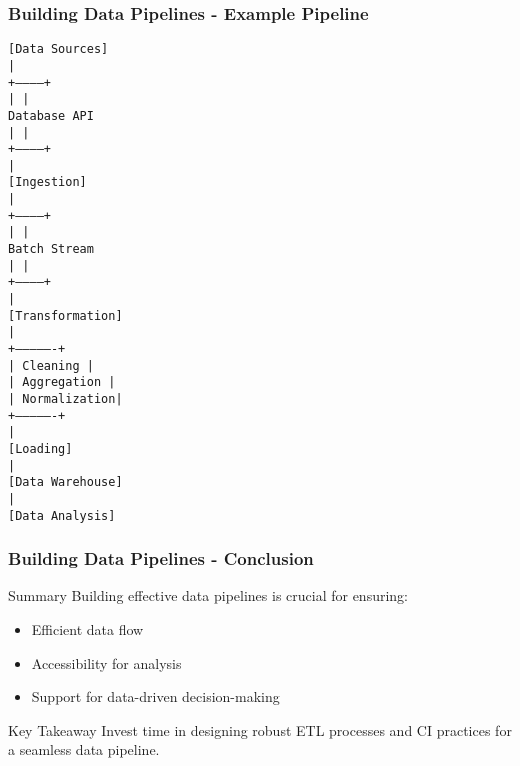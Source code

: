\documentclass{beamer}
\begin{document}
\begin{frame}[fragile]
    \frametitle{Building Data Pipelines - Example Pipeline}
    \begin{center}
        \texttt{[Data Sources]} \\
        \texttt{|} \\
        \texttt{+-----------+} \\
        \texttt{|           |} \\
        \texttt{Database    API} \\
        \texttt{|           |} \\
        \texttt{+-----------+} \\
        \texttt{|} \\
        \texttt{[Ingestion]} \\
        \texttt{|} \\
        \texttt{+-----------+} \\
        \texttt{|           |} \\
        \texttt{Batch      Stream} \\
        \texttt{|           |} \\
        \texttt{+-----------+} \\
        \texttt{|} \\
        \texttt{[Transformation]} \\
        \texttt{|} \\
        \texttt{+----------------+} \\
        \texttt{|   Cleaning     |} \\
        \texttt{|   Aggregation  |} \\
        \texttt{|   Normalization|} \\
        \texttt{+----------------+} \\
        \texttt{|} \\
        \texttt{[Loading]} \\
        \texttt{|} \\
        \texttt{[Data Warehouse]} \\
        \texttt{|} \\
        \texttt{[Data Analysis]} 
    \end{center}
\end{frame}

\begin{frame}[fragile]
    \frametitle{Building Data Pipelines - Conclusion}
    \begin{block}{Summary}
        Building effective data pipelines is crucial for ensuring:
        \begin{itemize}
            \item Efficient data flow
            \item Accessibility for analysis
            \item Support for data-driven decision-making
        \end{itemize}
    \end{block}
    \begin{block}{Key Takeaway}
        Invest time in designing robust ETL processes and CI practices for a seamless data pipeline.
    \end{block}
\end{frame}
\end{document}
